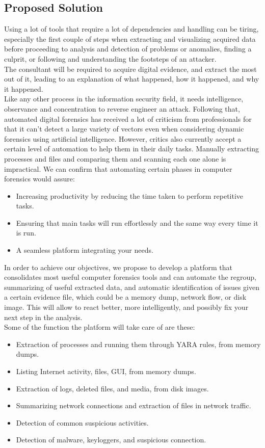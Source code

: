 \subsection{Proposed Solution}
Using a lot of tools that require a lot of dependencies and handling can be tiring, especially the first couple of steps when extracting and visualizing acquired data before proceeding to analysis and detection of problems or anomalies, finding a culprit, or following and understanding the footsteps of an attacker.\\
The consultant will be required to acquire digital evidence, and extract the most out of it, leading to an explanation of what happened, how it happened, and why it happened.\\
Like any other process in the information security field, it needs intelligence, observance and concentration to reverse engineer an attack. Following that, automated digital forensics has received a lot of criticism from professionals for that it can't detect a large variety of vectors even when considering dynamic forensics using artificial intelligence. However, critics also currently accept a certain level of automation to help them in their daily tasks.
Manually extracting processes and files and comparing them and scanning each one alone is impractical. We can confirm that automating certain phases in computer forensics would assure:
\begin{itemize}
    \item  Increasing productivity by reducing the time taken to perform repetitive tasks.
    \item  Ensuring that main tasks will run effortlessly and the same way every time it is run.
    \item  A seamless platform integrating your needs.
\end{itemize}
In order to achieve our objectives, we propose to develop a platform that consolidates most useful computer forensics tools and can automate the regroup, summarizing of useful extracted data, and automatic identification of issues given a certain evidence file, which could be a memory dump, network flow, or disk image. This will allow to react better, more intelligently, and possibly fix your next step in the analysis.\\
Some of the function the platform will take care of are these:
\begin{itemize}
    \item Extraction of processes and running them through YARA rules, from memory dumps.
    \item Listing Internet activity, files, GUI, from memory dumps.
    \item Extraction of logs, deleted files, and media, from disk images.
    \item Summarizing network connections and extraction of files in network traffic.
    \item Detection of common suspicious activities.
    \item Detection of malware, keyloggers, and suspicious connection.
\end{itemize}
